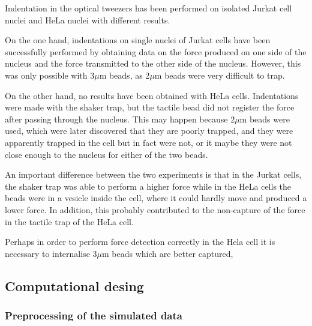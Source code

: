 \documentclass[12pt, a4paper]{article} %
\begin{document}
\setlength{\parskip}{0mm}

Indentation in the optical tweezers has been performed on isolated Jurkat cell nuclei and HeLa nuclei with different results.

\setlength{\parskip}{4mm}

On the one hand, indentations on single nuclei of Jurkat cells have been successfully performed by obtaining data on the force produced on one side of the nucleus and the force transmitted to the other side of the nucleus. However, this was only possible with 3$\mu$m beads, as 2$\mu$m beads were very difficult to trap. 

On the other hand, no results have been obtained with HeLa cells. Indentations were made with the shaker trap, but the tactile bead did not register the force after passing through the nucleus. This may happen because 2$\mu$m beads were used, which were later discovered that they are poorly trapped, and they were apparently trapped in the cell but in fact were not, or it maybe they were not close enough to the nucleus for either of the two beads. 

An important difference between the two experiments is that in the Jurkat cells, the shaker trap was able to perform a higher force while in the HeLa cells the beads were in a vesicle inside the cell, where it could hardly move and produced a lower force. In addition, this probably contributed to the non-capture of the force in the tactile trap of the HeLa cell.

Perhaps in order to perform force detection correctly in the Hela cell it is necessary to internalise 3$\mu$m beads which are better captured,

\subsection{Computational desing}

\subsubsection{Preprocessing of the simulated data}

\setlength{\parskip}{0mm}
\end{document}
